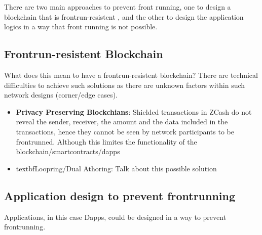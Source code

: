 There are two main approaches to prevent front running, one to design a blockchain that is frontrun-resistent , and the other to design the application logics in a way that front running is not possible. 


\subsection{Frontrun-resistent Blockchain}
What does this mean to have a frontrun-resistent blockchain?  There are technical difficulties to achieve such solutions as there are unknown factors within such network designs (corner/edge cases).

\begin{itemize}
\item{\textbf{Privacy Preserving Blockchians}: Shielded transactions in ZCash do not reveal the sender, receiver, the amount and the data included in the transactions, hence they cannot be seen by network participants to be frontrunned. Although this limites the functionality of the blockchain/smartcontracts/dapps }
\item{textbf{Loopring/Dual Athoring}: Talk about this possible solution}

\end{itemize}


\subsection{Application design to prevent frontrunning}
Applications, in this case Dapps, could be designed in a way to prevent frontrunning.

